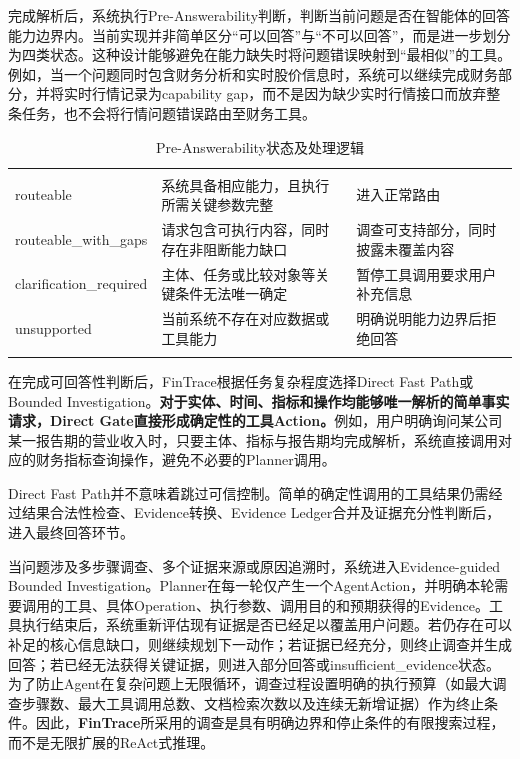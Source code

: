 完成解析后，系统执行Pre-Answerability判断，判断当前问题是否在智能体的回答能力边界内。当前实现并非简单区分“可以回答”与“不可以回答”，而是进一步划分为四类状态。这种设计能够避免在能力缺失时将问题错误映射到“最相似”的工具。例如，当一个问题同时包含财务分析和实时股价信息时，系统可以继续完成财务部分，并将实时行情记录为capability gap，而不是因为缺少实时行情接口而放弃整条任务，也不会将行情问题错误路由至财务工具。

\begin{table}[htbp]
  \centering
  \caption{Pre-Answerability状态及处理逻辑}
  \label{tab:architecture_2}
  \begin{tabular}{C{.18\textwidth}C{.27\textwidth}C{.45\textwidth}}
    \fintracetoprule
     &  &  \\
    \fintracemidrule
    routeable & 系统具备相应能力，且执行所需关键参数完整 & 进入正常路由 \\
    routeable\_with\_gaps & 请求包含可执行内容，同时存在非阻断能力缺口 & 调查可支持部分，同时披露未覆盖内容 \\
    clarification\_required & 主体、任务或比较对象等关键条件无法唯一确定 & 暂停工具调用要求用户补充信息 \\
    unsupported & 当前系统不存在对应数据或工具能力 & 明确说明能力边界后拒绝回答 \\
    \fintracebottomrule
  \end{tabular}
\end{table}

在完成可回答性判断后，FinTrace根据任务复杂程度选择Direct Fast Path或Bounded Investigation。\textbf{对于实体、时间、指标和操作均能够唯一解析的简单事实请求，Direct Gate直接形成确定性的工具Action。}例如，用户明确询问某公司某一报告期的营业收入时，只要主体、指标与报告期均完成解析，系统直接调用对应的财务指标查询操作，避免不必要的Planner调用。

Direct Fast Path并不意味着跳过可信控制。简单的确定性调用的工具结果仍需经过结果合法性检查、Evidence转换、Evidence Ledger合并及证据充分性判断后，进入最终回答环节。

当问题涉及多步骤调查、多个证据来源或原因追溯时，系统进入Evidence-guided Bounded Investigation。Planner在每一轮仅产生一个AgentAction，并明确本轮需要调用的工具、具体Operation、执行参数、调用目的和预期获得的Evidence。工具执行结束后，系统重新评估现有证据是否已经足以覆盖用户问题。若仍存在可以补足的核心信息缺口，则继续规划下一动作；若证据已经充分，则终止调查并生成回答；若已经无法获得关键证据，则进入部分回答或insufficient\_evidence状态。为了防止Agent在复杂问题上无限循环，调查过程设置明确的执行预算（如最大调查步骤数、最大工具调用总数、文档检索次数以及连续无新增证据）作为终止条件。因此，\textbf{FinTrace}所采用的调查是具有明确边界和停止条件的有限搜索过程，而不是无限扩展的ReAct式推理。

